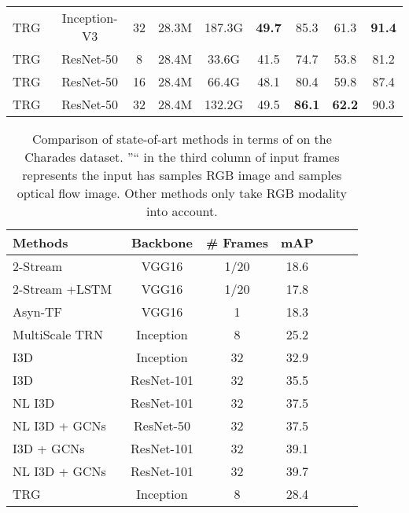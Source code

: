 \documentclass[conference,compsoc]{IEEEtran}
\begin{document}
\begin{table*}[!htb]
\begin{center}
\begin{tabular}{lcccccccc}
         TRG~ & Inception-V3 & 32 & 28.3M & 187.3G & \textbf{49.7} & 85.3 & 61.3  &\textbf{91.4}\\
         TRG~ & ResNet-50 & 8 & 28.4M & 33.6G & 41.5 & 74.7 & 53.8  &81.2\\
         TRG~ & ResNet-50 & 16 & 28.4M & 66.4G & 48.1 & 80.4 & 59.8  & 87.4\\
         TRG~ & ResNet-50 & 32 & 28.4M & 132.2G & 49.5 & \textbf{86.1} & \textbf{62.2}  & 90.3\\
         \bottomrule
        \end{tabular}
        \end{center}
        \vspace{-3mm}
        \label{tab:compare_smth}
    \end{table*}
    
    \begin{table}[!htb]
\caption{Comparison of state-of-art methods in terms of on the Charades dataset. ''`` in the third column of input frames represents the input has  samples RGB image and  samples optical flow image. Other methods only take RGB modality into account.}
        \begin{center}
        \begin{tabular}{lcccccc}
        \toprule
         Methods & Backbone& \# Frames& mAP \\
         \midrule
         2-Stream~\cite{sigurdsson2017asynchronous} & VGG16 & 1/20 & 18.6 \\
         2-Stream +LSTM~\cite{sigurdsson2017asynchronous} & VGG16 & 1/20 & 17.8 \\
         Asyn-TF~\cite{sigurdsson2017asynchronous} & VGG16  & 1 & 18.3  \\
         MultiScale TRN~\cite{zhou2018temporal} & Inception & 8 & 25.2  \\
         I3D~\cite{carreira2017quo} & Inception & 32 & 32.9  \\
         I3D~\cite{wang2018non} & ResNet-101 & 32 & 35.5  \\
         NL I3D~\cite{wang2018non}  & ResNet-101  & 32 & 37.5  \\
         NL I3D + GCNs~\cite{wang2018videos} & ResNet-50 & 32 & 37.5  \\
         I3D + GCNs~\cite{wang2018videos} & ResNet-101 & 32 & 39.1  \\
         NL I3D + GCNs \cite{wang2018videos}  ~& ResNet-101 & 32 & 39.7   \\ \hline
         TRG~ & Inception & 8 & 28.4   \\

\end{tabular}
\end{center}
\end{table}
\end{document}
